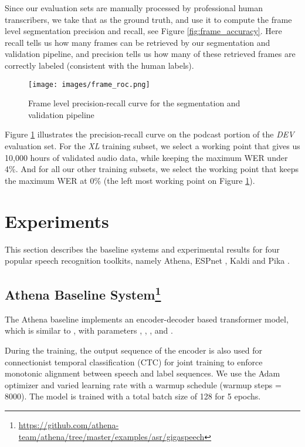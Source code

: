 \documentclass[a4paper]{article}
\begin{document}
Since our evaluation sets are manually processed by professional human transcribers,
we take that as the ground truth, and use it to compute the frame level segmentation
precision and recall, see Figure \ref{fig:frame_accuracy}. Here recall tells us
how many frames can be retrieved by our segmentation and validation pipeline, and
precision tells us how many of these retrieved frames are correctly labeled (consistent
with the human labels).

\begin{figure}[t]
  \centering
  \texttt{[image: images/frame\_roc.png]}
  \vspace{-6ex}
  \caption{Frame level precision-recall curve for the segmentation and validation pipeline}
  \vspace{-4ex}
  \label{fig:frame_roc}
\end{figure}

Figure \ref{fig:frame_roc} illustrates the precision-recall curve on the podcast
portion of the {\it DEV} evaluation set. For the {\it XL} training subset, we
select a working point that gives us 10,000 hours of validated audio data, while
keeping the maximum WER under 4\%. And for all our other training subsets, we
select the working point that keeps the maximum WER at 0\% (the left most
working point on Figure \ref{fig:frame_roc}).

\section{Experiments}
This section describes the baseline systems and experimental results for four popular speech recognition
toolkits, namely Athena, ESPnet \cite{Watanabe2018ESPnet},
Kaldi \cite{povey2011kaldi} and Pika \cite{Weng2020}.

\subsection[Athena Baseline System]{Athena Baseline System\footnote{\url{https://github.com/athena-team/athena/tree/master/examples/asr/gigaspeech}}\label{foot:athena}}
The Athena baseline implements an encoder-decoder based transformer model, which
is similar to \cite{karita2019comparative}, with parameters
, , ,  and .

During the training, the output sequence of the encoder is also used for
connectionist temporal classification (CTC) for joint training to enforce
monotonic alignment between speech and label sequences. We use the Adam
optimizer and varied learning rate with a warmup schedule (warmup steps = 8000).
The model is trained with a total batch size of 128 for 5 epochs.
\end{document}
